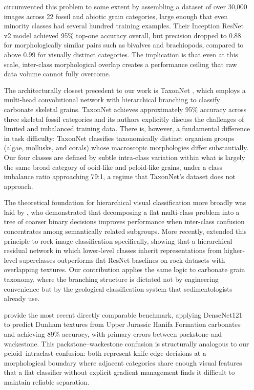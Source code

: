 \documentclass[a4paper,fleqn]{cas-dc}
\begin{document}
\citet{liu2020} circumvented this problem to some extent by assembling a dataset of over 30,000 images across 22 fossil and abiotic grain categories, large enough that even minority classes had several hundred training examples. Their Inception ResNet v2 model achieved 95\% top-one accuracy overall, but precision dropped to 0.88 for morphologically similar pairs such as bivalves and brachiopods, compared to above 0.99 for visually distinct categories. The implication is that even at this scale, inter-class morphological overlap creates a performance ceiling that raw data volume cannot fully overcome.

The architecturally closest precedent to our work is TaxonNet \citep{ho2023}, which employs a multi-head convolutional network with hierarchical branching to classify carbonate skeletal grains. TaxonNet achieves approximately 95\% accuracy across three skeletal fossil categories and its authors explicitly discuss the challenges of limited and imbalanced training data. There is, however, a fundamental difference in task difficulty: TaxonNet classifies taxonomically distinct organism groups (algae, mollusks, and corals) whose macroscopic morphologies differ substantially. Our four classes are defined by subtle intra-class variation within what is largely the same broad category of ooid-like and peloid-like grains, under a class imbalance ratio approaching 79:1, a regime that TaxonNet's dataset does not approach.

The theoretical foundation for hierarchical visual classification more broadly was laid by \citet{yan2015hdcnn}, who demonstrated that decomposing a flat multi-class problem into a tree of coarser binary decisions improves performance when inter-class confusion concentrates among semantically related subgroups. More recently, \citet{zhang2024shn} extended this principle to rock image classification specifically, showing that a hierarchical residual network in which lower-level classes inherit representations from higher-level superclasses outperforms flat ResNet baselines on rock datasets with overlapping textures. Our contribution applies the same logic to carbonate grain taxonomy, where the branching structure is dictated not by engineering convenience but by the geological classification system that sedimentologists already use.

\citet{liudunham2023} provide the most recent directly comparable benchmark, applying DenseNet121 to predict Dunham textures from Upper Jurassic Hanifa Formation carbonates and achieving 89\% accuracy, with primary errors between packstone and wackestone. This packstone--wackestone confusion is structurally analogous to our peloid--intraclast confusion: both represent knife-edge decisions at a morphological boundary where adjacent categories share enough visual features that a flat classifier without explicit gradient management finds it difficult to maintain reliable separation.
\end{document}
